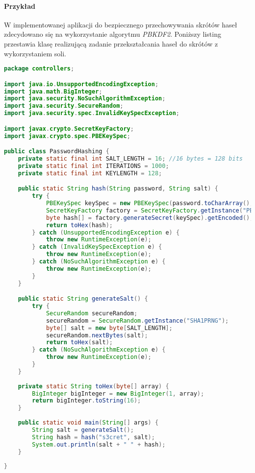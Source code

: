 \documentclass[11pt]{aghdpl}
\begin{document}
\paragraph{Przykład}

W implementowanej aplikacji do bezpiecznego przechowywania skrótów haseł zdecydowano się na wykorzystanie algorytmu \emph{PBKDF2}. Poniższy listing przestawia klasę realizującą zadanie przekształcania haseł do skrótów z wykorzystaniem soli.

\begin{lstlisting}[language=Java]
package controllers;

import java.io.UnsupportedEncodingException;
import java.math.BigInteger;
import java.security.NoSuchAlgorithmException;
import java.security.SecureRandom;
import java.security.spec.InvalidKeySpecException;

import javax.crypto.SecretKeyFactory;
import javax.crypto.spec.PBEKeySpec;

public class PasswordHashing {
	private static final int SALT_LENGTH = 16; //16 bytes = 128 bits
	private static final int ITERATIONS = 1000;
	private static final int KEYLENGTH = 128;

	public static String hash(String password, String salt) {
		try {
			PBEKeySpec keySpec = new PBEKeySpec(password.toCharArray(), salt.getBytes("UTF-8"), ITERATIONS, KEYLENGTH);
			SecretKeyFactory factory = SecretKeyFactory.getInstance("PBKDF2WithHmacSHA1");
			byte hash[] = factory.generateSecret(keySpec).getEncoded();
			return toHex(hash);
		} catch (UnsupportedEncodingException e) {
			throw new RuntimeException(e);
		} catch (InvalidKeySpecException e) {
			throw new RuntimeException(e);
		} catch (NoSuchAlgorithmException e) {
			throw new RuntimeException(e);
		}
	}

	public static String generateSalt() {
		try {
			SecureRandom secureRandom;
			secureRandom = SecureRandom.getInstance("SHA1PRNG");
			byte[] salt = new byte[SALT_LENGTH];
			secureRandom.nextBytes(salt);
			return toHex(salt);
		} catch (NoSuchAlgorithmException e) {
			throw new RuntimeException(e);
		}
	}
	
	private static String toHex(byte[] array) {
		BigInteger bigInteger = new BigInteger(1, array);
		return bigInteger.toString(16);
	}
	
	public static void main(String[] args) {
		String salt = generateSalt();
		String hash = hash("s3cret", salt);
		System.out.println(salt + " " + hash);
	}
	
}
\end{lstlisting}
\end{document}

